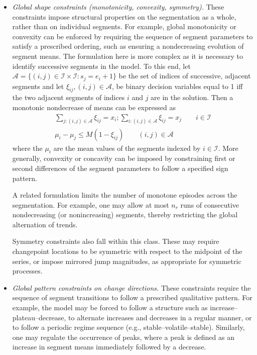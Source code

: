 \documentclass[preprints,article,submit,pdftex,moreauthors]{Definitions/mdpi}
\begin{document}
\begin{itemize}
	\item {\it Global shape constraints (monotonicity, convexity, symmetry).}
	These constraints impose structural properties on the segmentation as a whole, rather than on individual segments.
	For example, global monotonicity or convexity can be enforced by requiring the sequence of segment parameters to satisfy a prescribed ordering, such as ensuring a nondecreasing evolution of segment means. The formulation here is more complex as it is necessary to identify successive segments in the model. To this end, let $\mathcal{A} = \{(i,j) \in \mathcal{I} \times \mathcal{I} : s_j = e_i+1 \}$ be the set of indices of successive, adjacent segments and let $\xi_{ij}, (i,j) \in \mathcal{A}$, be binary decision variables equal to 1 iff the two adjacent segments of indices $i$ and $j$ are in the solution. Then a monotonic nondecrease of means can be expressed as 
	\begin{equation}
		\begin{split}
			\sum_{j:(i,j)\in \mathcal{A}} \xi_{ij} = x_i; 
			\sum_{i:(i,j)\in \mathcal{A}} \xi_{ij} = x_j \qquad i \in \mathcal{I} \\
			\mu_i - \mu_j \leq M(1-\xi_{ij}) \qquad (i,j) \in \mathcal{A}
		\end{split}
	\end{equation}
	where the $\mu_i$ are the mean values of the segments indexed by $i \in \mathcal{I}$. More generally, convexity or concavity can be imposed by constraining first or second differences of the segment parameters to follow a specified sign pattern.
	
	A related formulation limits the number of monotone episodes across the segmentation. For example, one may allow at most $n_r$ runs of consecutive nondecreasing (or nonincreasing) segments, thereby restricting the global alternation of trends.
	
	Symmetry constraints also fall within this class. These may require changepoint locations to be symmetric with respect to the midpoint of the series, or impose mirrored jump magnitudes, as appropriate for symmetric processes.
	
	\item {\it Global pattern constraints on change directions.}
	These constraints require the sequence of segment transitions to follow a prescribed qualitative pattern. For example, the model may be forced to follow a structure such as increase–plateau–decrease, to alternate increases and decreases in a regular manner, or to follow a periodic regime sequence (e.g., stable–volatile–stable). Similarly, one may regulate the occurrence of peaks, where a peak is defined as an increase in segment means immediately followed by a decrease.
	

\end{itemize}
\end{document}
